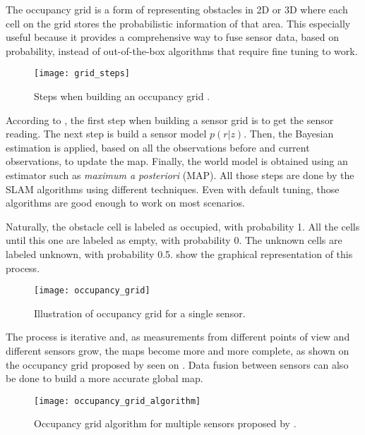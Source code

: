 The occupancy grid is a form of representing obstacles in 2D or 3D where each cell on the grid stores the probabilistic information of that area. This especially useful because it provides a comprehensive way to fuse sensor data, based on probability, instead of out-of-the-box algorithms that require fine tuning to work.

\begin{figure}[!ht]
    \centering
    \texttt{[image: grid\_steps]}
    \caption[Steps when building an occupancy grid.]{Steps when building an occupancy grid \cite{elfes1989using}.}
    \label{fig:grid_steps}
\end{figure}

According to , the first step when building a sensor grid is to get the sensor reading. The next step is build a sensor model $p(r|z)$. Then, the Bayesian estimation is applied, based on all the observations before and current observations, to update the map. Finally, the world model is obtained using an estimator such as \textit{maximum a posteriori} (MAP). All those steps are done by the SLAM algorithms using different techniques. Even with default tuning, those algorithms are good enough to work on most scenarios.

Naturally, the obstacle cell is labeled as occupied, with probability 1. All the cells until this one are labeled as empty, with probability 0. The unknown cells are labeled unknown, with probability 0.5.  show the graphical representation of this process.

\begin{figure}[!ht]
    \centering
    \texttt{[image: occupancy\_grid]}
    \caption{Illustration of occupancy grid for a single sensor.}
    \label{fig:occupancy_grid}
\end{figure}

The process is iterative and, as measurements from different points of view and different sensors grow, the maps become more and more complete, as shown on the occupancy grid proposed by \citeauthor{elfes1989using} seen on  . Data fusion between sensors can also be done to build a more accurate global map.

\begin{figure}[!ht]
    \centering
    \texttt{[image: occupancy\_grid\_algorithm]}
    \caption[Occupancy grid algorithm for multiple sensors proposed by Elfes.]{Occupancy grid algorithm for multiple sensors proposed by \citeauthor{elfes1989using}.}
    \label{fig:occupancy_grid_algorithm}
\end{figure}

